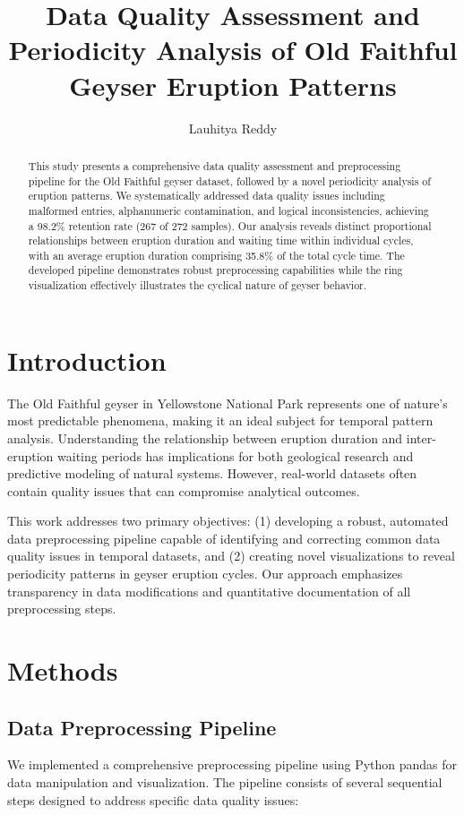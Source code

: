 \documentclass[fleqn,10pt]{olplainarticle}
\title{Data Quality Assessment and Periodicity Analysis of Old Faithful Geyser Eruption Patterns}
\author[1]{Lauhitya Reddy}
\affil[1]{Department of Biomedical Informatics, Emory University}
\begin{document}
\flushbottom
\maketitle
\thispagestyle{empty}

\begin{abstract}
This study presents a comprehensive data quality assessment and preprocessing pipeline for the Old Faithful geyser dataset, followed by a novel periodicity analysis of eruption patterns. We systematically addressed data quality issues including malformed entries, alphanumeric contamination, and logical inconsistencies, achieving a 98.2\% retention rate (267 of 272 samples). Our analysis reveals distinct proportional relationships between eruption duration and waiting time within individual cycles, with an average eruption duration comprising 35.8\% of the total cycle time. The developed pipeline demonstrates robust preprocessing capabilities while the ring visualization effectively illustrates the cyclical nature of geyser behavior.
\end{abstract}

\section*{Introduction}

The Old Faithful geyser in Yellowstone National Park represents one of nature's most predictable phenomena, making it an ideal subject for temporal pattern analysis. Understanding the relationship between eruption duration and inter-eruption waiting periods has implications for both geological research and predictive modeling of natural systems. However, real-world datasets often contain quality issues that can compromise analytical outcomes.

This work addresses two primary objectives: (1) developing a robust, automated data preprocessing pipeline capable of identifying and correcting common data quality issues in temporal datasets, and (2) creating novel visualizations to reveal periodicity patterns in geyser eruption cycles. Our approach emphasizes transparency in data modifications and quantitative documentation of all preprocessing steps.

\section*{Methods}

\subsection*{Data Preprocessing Pipeline}
We implemented a comprehensive preprocessing pipeline using Python pandas for data manipulation and visualization. The pipeline consists of several sequential steps designed to address specific data quality issues:
\end{document}
